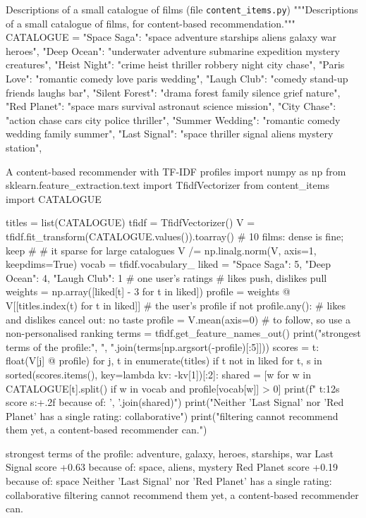 \begin{pylisting}[label={lst:catalogue}]{Descriptions of a small catalogue of films (file \texttt{content\_items.py})}
"""Descriptions of a small catalogue of films, for content-based recommendation."""
CATALOGUE = {
    "Space Saga": "space adventure starships aliens galaxy war heroes",
    "Deep Ocean": "underwater adventure submarine expedition mystery creatures",
    "Heist Night": "crime heist thriller robbery night city chase",
    "Paris Love": "romantic comedy love paris wedding",
    "Laugh Club": "comedy stand-up friends laughs bar",
    "Silent Forest": "drama forest family silence grief nature",
    "Red Planet": "space mars survival astronaut science mission",
    "City Chase": "action chase cars city police thriller",
    "Summer Wedding": "romantic comedy wedding family summer",
    "Last Signal": "space thriller signal aliens mystery station",
}
\end{pylisting}

\begin{pylisting}[label={lst:contentbased}]{A content-based recommender with TF-IDF profiles}
import numpy as np
from sklearn.feature_extraction.text import TfidfVectorizer
from content_items import CATALOGUE

titles = list(CATALOGUE)
tfidf = TfidfVectorizer()
V = tfidf.fit_transform(CATALOGUE.values()).toarray()   # 10 films: dense is fine; keep
#                                                         # it sparse for large catalogues
V /= np.linalg.norm(V, axis=1, keepdims=True)
vocab = tfidf.vocabulary_
liked = {"Space Saga": 5, "Deep Ocean": 4, "Laugh Club": 1}   # one user's ratings
# likes push, dislikes pull
weights = np.array([liked[t] - 3 for t in liked])
profile = weights @ V[[titles.index(t) for t in liked]]         # the user's profile
if not profile.any():                       # likes and dislikes cancel out: no taste
    profile = V.mean(axis=0)                # to follow, so use a non-personalised ranking
terms = tfidf.get_feature_names_out()
print("strongest terms of the profile:", ", ".join(terms[np.argsort(-profile)[:5]]))
scores = {t: float(V[j] @ profile) for j, t in enumerate(titles) if t not in liked}
for t, s in sorted(scores.items(), key=lambda kv: -kv[1])[:2]:
    shared = [w for w in CATALOGUE[t].split() if w in vocab and profile[vocab[w]] > 0]
    print(f"  {t:12s} score {s:+.2f}   because of: {', '.join(shared)}")
print("Neither 'Last Signal' nor 'Red Planet' has a single rating: collaborative")
print("filtering cannot recommend them yet, a content-based recommender can.")
\end{pylisting}
\begin{pyoutput}
strongest terms of the profile: adventure, galaxy, heroes, starships, war
  Last Signal  score +0.63   because of: space, aliens, mystery
  Red Planet   score +0.19   because of: space
Neither 'Last Signal' nor 'Red Planet' has a single rating: collaborative
filtering cannot recommend them yet, a content-based recommender can.
\end{pyoutput}


